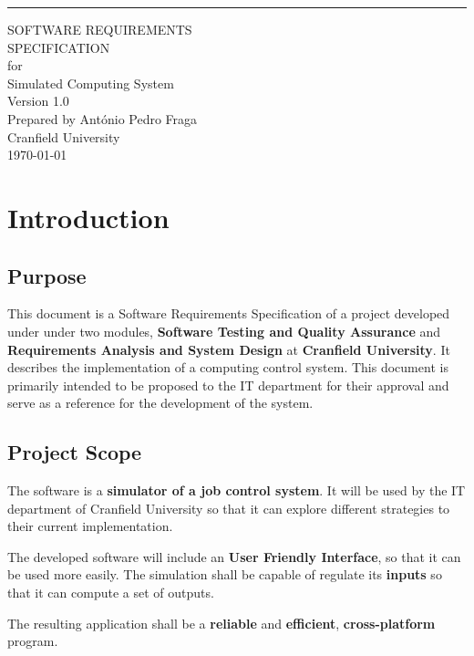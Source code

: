 \documentclass{scrreprt}
\date{}
\def\myversion{1.0 }
\begin{document}
\begin{flushright}
    \rule{16cm}{5pt}\vskip1cm
    \begin{bfseries}
        \Huge{SOFTWARE REQUIREMENTS\\ SPECIFICATION}\\
        \vspace{1.9cm}
        for\\
        \vspace{1.9cm}
        Simulated Computing System\\
        \vspace{1.9cm}
        \LARGE{Version \myversion}\\
        \vspace{1.9cm}
        Prepared by António Pedro Fraga\\
        \vspace{1.9cm}
        Cranfield University\\
        \vspace{1.9cm}
        \today\\
    \end{bfseries}
\end{flushright}

\tableofcontents

\chapter{Introduction}

\section{Purpose}
This document is a Software Requirements Specification of a project developed under under two modules, \textbf{Software Testing and Quality Assurance} and  \textbf{Requirements Analysis and System Design} at \textbf{Cranfield University}. It describes the implementation of a computing control system. This document is primarily intended to be proposed to the IT department for their approval and serve as a reference for the development of the system.


\section{Project Scope}

\par The software is a \textbf{simulator of a job control system}. It will be used by the IT department of Cranfield University so that it can explore different strategies to their current implementation. 
\par The developed software will include an \textbf{User Friendly Interface}, so that it can be used more easily. The simulation shall be capable of regulate its \textbf{inputs} so that it can compute a set of outputs.
\par The resulting application shall be a \textbf{reliable} and \textbf{efficient}, \textbf{cross-platform} program.
\end{document}
